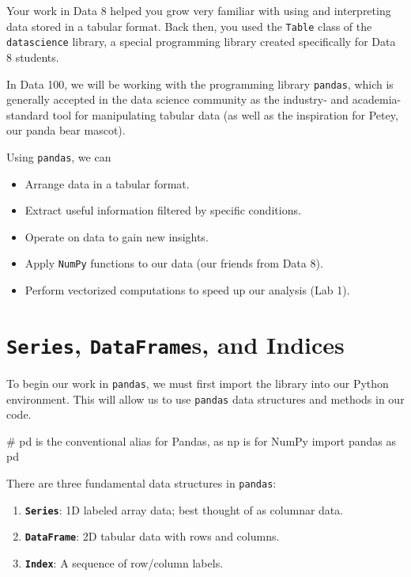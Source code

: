 \documentclass[
  letterpaper,
  DIV=11,
  numbers=noendperiod]{scrreprt}
\newenvironment{Shaded}{\begin{snugshade}}{\end{snugshade}}
\newcommand{\CommentTok}[1]{\textcolor[rgb]{0.37,0.37,0.37}{#1}}
\newcommand{\ImportTok}[1]{\textcolor[rgb]{0.00,0.46,0.62}{#1}}
\newcommand{\NormalTok}[1]{\textcolor[rgb]{0.00,0.23,0.31}{#1}}
\providecommand{\tightlist}{%
  \setlength{\itemsep}{0pt}\setlength{\parskip}{0pt}}\usepackage{longtable,booktabs,array}
\begin{document}
Your work in Data 8 helped you grow very familiar with using and
interpreting data stored in a tabular format. Back then, you used the
\texttt{Table} class of the \texttt{datascience} library, a special
programming library created specifically for Data 8 students.

In Data 100, we will be working with the programming library
\texttt{pandas}, which is generally accepted in the data science
community as the industry- and academia-standard tool for manipulating
tabular data (as well as the inspiration for Petey, our panda bear
mascot).

Using \texttt{pandas}, we can

\begin{itemize}
\tightlist
\item
  Arrange data in a tabular format.
\item
  Extract useful information filtered by specific conditions.
\item
  Operate on data to gain new insights.
\item
  Apply \texttt{NumPy} functions to our data (our friends from Data 8).
\item
  Perform vectorized computations to speed up our analysis (Lab 1).
\end{itemize}

\section{\texorpdfstring{\texttt{Series}, \texttt{DataFrame}s, and
Indices}{Series, DataFrames, and Indices}}\label{series-dataframes-and-indices}

To begin our work in \texttt{pandas}, we must first import the library
into our Python environment. This will allow us to use \texttt{pandas}
data structures and methods in our code.

\begin{Shaded}
\begin{Highlighting}[]
\CommentTok{\# \textasciigrave{}pd\textasciigrave{} is the conventional alias for Pandas, as \textasciigrave{}np\textasciigrave{} is for NumPy}
\ImportTok{import}\NormalTok{ pandas }\ImportTok{as}\NormalTok{ pd}
\end{Highlighting}
\end{Shaded}

There are three fundamental data structures in \texttt{pandas}:

\begin{enumerate}
\def\labelenumi{\arabic{enumi}.}
\tightlist
\item
  \textbf{\texttt{Series}}: 1D labeled array data; best thought of as
  columnar data.
\item
  \textbf{\texttt{DataFrame}}: 2D tabular data with rows and columns.
\item
  \textbf{\texttt{Index}}: A sequence of row/column labels.
\end{enumerate}
\end{document}
